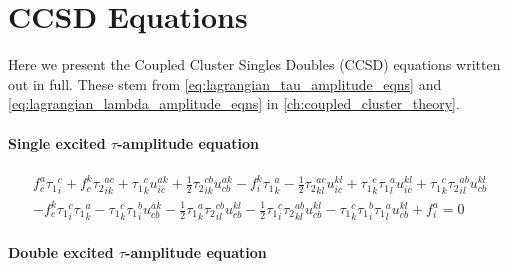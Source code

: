 \section{CCSD Equations}
\label{app:ccsd_equations}

Here we present the Coupled Cluster Singles Doubles (CCSD) equations 
written out in full. These stem from \autoref{eq:lagrangian_tau_amplitude_eqns}
and \autoref{eq:lagrangian_lambda_amplitude_eqns} in \autoref{ch:coupled_cluster_theory}.

\paragraph{Single excited $\tau$-amplitude equation}

\begin{gather*}
f^{a}_{c} {\tau_1}^{c}_{i} 
+ f^{k}_{c} {\tau_2}^{ac}_{ik} 
+ {\tau_1}^{c}_{k} u^{ak}_{ic}
+ \frac{1}{2}{\tau_2}^{cb}_{ik} u^{ak}_{cb} 
- f^{k}_{i} {\tau_1}^{a}_{k}
- \frac{1}{2}{\tau_2}^{ac}_{kl} u^{kl}_{ic}
+ {\tau_1}^{c}_{k} {\tau_1}^{a}_{l} u^{kl}_{ic} 
 + {\tau_1}^{c}_{k} {\tau_2}^{ab}_{il} u^{kl}_{cb} \\
- f^{k}_{c} {\tau_1}^{c}_{i} {\tau_1}^{a}_{k}
- {\tau_1}^{c}_{k} {\tau_1}^{b}_{i} u^{ak}_{cb}
- \frac{1}{2}{\tau_1}^{a}_{k} {\tau_2}^{cb}_{il} u^{kl}_{cb}
- \frac{1}{2}{\tau_1}^{c}_{i} {\tau_2}^{ab}_{kl} u^{kl}_{cb}
- {\tau_1}^{c}_{k} {\tau_1}^{b}_{i} {\tau_1}^{a}_{l} u^{kl}_{cb}
+ f^{a}_{i}
= 0
\end{gather*}

\paragraph{Double excited $\tau$-amplitude equation}

